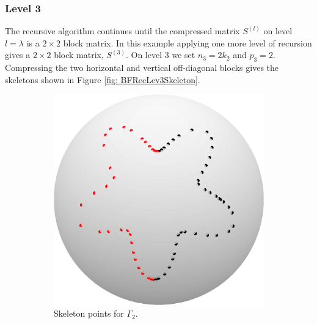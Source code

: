 \documentclass{sfuthesis}
\begin{document}
\subsubsection{Level 3}
The recursive algorithm continues until the compressed matrix $S^{(l)}$ on level $l=\lambda$ is a $2 \times 2$ block matrix. In this example applying one more level of recursion gives a $2\times2$ block matrix, $S^{(3)}$. On level 3 we set $n_3=2k_2$ and $p_3=2$. Compressing the two horizontal and vertical off-diagonal blocks gives the skeletons shown in Figure \ref{fig: BFRecLev3Skeleton}. 
\begin{figure}[h]
	\centering
	\begin{subfigure}[b]{0.24\textwidth}
	\captionsetup{justification=centering}
		\includegraphics[width=\textwidth]{BFRecLev3Skel2}
    		\caption{Skeleton points for $\Gamma_2$.} 
      \end{subfigure}
      \quad
      \begin{subfigure}[b]{0.24\textwidth}
      \captionsetup{justification=centering}

\end{subfigure}
\end{figure}
\end{document}
